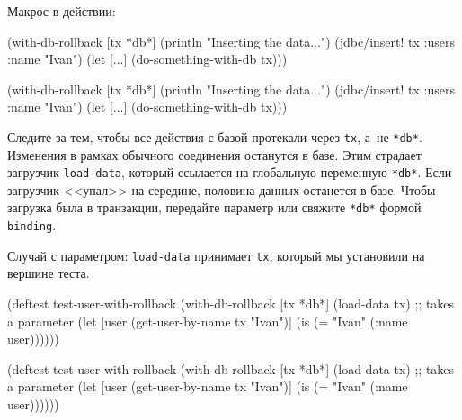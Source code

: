\fi

\noindent
Макрос в действии:

\ifx\devicetype\mobile

\begin{english}
  \begin{clojure}
(with-db-rollback [tx *db*]
  (println "Inserting the data...")
  (jdbc/insert! tx
    :users {:name "Ivan"})
  (let [...]
    (do-something-with-db tx)))
  \end{clojure}
\end{english}

\else

\begin{english}
  \begin{clojure}
(with-db-rollback [tx *db*]
  (println "Inserting the data...")
  (jdbc/insert! tx :users {:name "Ivan"})
  (let [...]
    (do-something-with-db tx)))
  \end{clojure}
\end{english}

\fi

Следите за тем, чтобы все действия с базой протекали через \verb|tx|, а~не
\verb|*db*|. Изменения в рамках обычного соединения останутся в базе. Этим
страдает загрузчик \verb|load-data|, который ссылается на глобальную переменную
\verb|*db*|. Если загрузчик <<упал>> на середине, половина данных останется в
базе. Чтобы загрузка была в транзакции, передайте параметр или свяжите
\verb|*db*| формой \verb|binding|.

Случай с параметром: \verb|load-data| принимает \verb|tx|, который мы
установили на вершине теста.

\ifx\devicetype\mobile

\begin{english}
  \begin{clojure}
(deftest test-user-with-rollback
  (with-db-rollback [tx *db*]
    (load-data tx) ;; takes a parameter
    (let [user
          (get-user-by-name tx "Ivan")]
      (is (= "Ivan" (:name user))))))
  \end{clojure}
\end{english}

\else

\begin{english}
  \begin{clojure}
(deftest test-user-with-rollback
  (with-db-rollback [tx *db*]
    (load-data tx) ;; takes a parameter
    (let [user (get-user-by-name tx "Ivan")]
      (is (= "Ivan" (:name user))))))
  \end{clojure}
\end{english}

